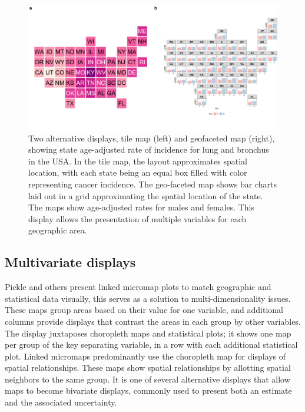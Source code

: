 \documentclass{monashthesis}
\begin{document}
\begin{figure}

{\centering \includegraphics[width=1\linewidth]{figures/02-literature/gggrids} 

}

\caption{ Two alternative displays, tile map (left) and geofaceted map (right), showing state age-adjusted rate of incidence for lung and bronchus in the USA. In the tile map, the layout approximates spatial location, with each state being an equal box filled with color representing cancer incidence. The geo-faceted map shows bar charts laid out in a grid approximating the spatial location of the state. The maps show age-adjusted rates for males and females. This display allows the presentation of multiple variables for each geographic area.}\label{fig:ggtilemap}
\end{figure}

\hypertarget{multivariate-displays}{%
\subsection{Multivariate displays}\label{multivariate-displays}}

Pickle and others \autocite{MMST} present linked micromap plots to match geographic and statistical data visually, this serves as a solution to multi-dimensionality issues. These maps group areas based on their value for one variable, and additional columns provide displays that contrast the areas in each group by other variables. The display juxtaposes choropleth maps and statistical plots; it shows one map per group of the key separating variable, in a row with each additional statistical plot. Linked micromaps predominantly use the choropleth map for displays of spatial relationships. These maps show spatial relationships by allotting spatial neighbors to the same group. It is one of several alternative displays that allow maps to become bivariate displays, commonly used to present both an estimate and the associated uncertainty.
\end{document}
